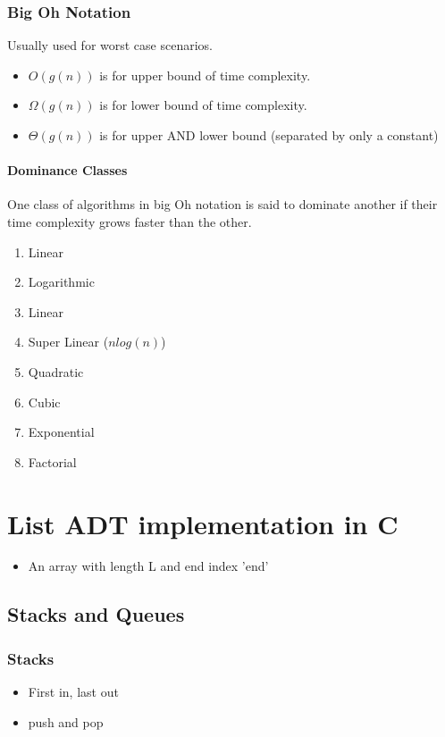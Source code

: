 \documentclass[a4paper,12pt]{report}
\begin{document}
\subsection{Big Oh Notation}
Usually used for worst case scenarios.
\begin{itemize}
\item $O(g(n))$ is for upper bound of time complexity.
\item $\Omega(g(n))$ is for lower bound of time complexity.
\item $\Theta(g(n))$ is for upper AND lower bound (separated by only a constant)
\end{itemize}

\subsubsection{Dominance Classes}
One class of algorithms in big Oh notation is said to dominate another if their time complexity grows faster than the other.
\begin{enumerate}
\item Linear
\item Logarithmic
\item Linear
\item Super Linear ($n log(n)$)
\item Quadratic
\item Cubic
\item Exponential
\item Factorial
\end{enumerate}
	

\chapter{List ADT implementation in C}
\begin{itemize}
\item An array with length L and end index 'end'
\end{itemize}

\section{Stacks and Queues}
\subsection{Stacks}
\begin{itemize}
\item First in, last out
\item push and pop
\end{itemize}
\end{document}
